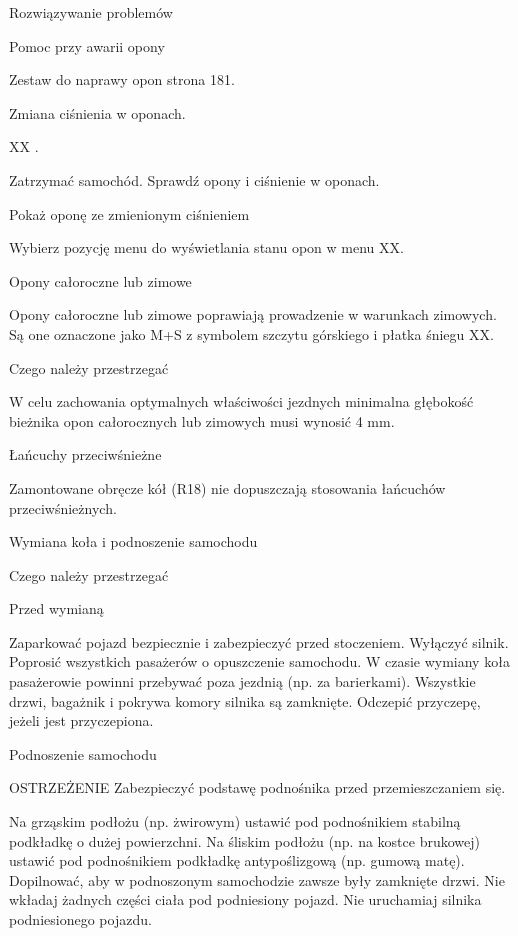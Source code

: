 Rozwiązywanie problemów

Pomoc przy awarii opony

\begin{itemizeTriangle}
	\itemTriangle Zestaw do naprawy opon \guillemotright strona 181.
\end{itemizeTriangle}

Zmiana ciśnienia w oponach.

XX .
\begin{itemizeArrow}
	\itemArrow Zatrzymać samochód.
	\itemArrow Sprawdź opony i ciśnienie w oponach.
\end{itemizeArrow}

Pokaż oponę ze zmienionym ciśnieniem

\begin{itemizeArrow}
	\itemArrow Wybierz pozycję menu do wyświetlania stanu opon w menu XX.
\end{itemizeArrow}

Opony całoroczne lub zimowe

Opony całoroczne lub zimowe poprawiają prowadzenie w warunkach zimowych. Są one oznaczone jako M+S z symbolem szczytu górskiego i płatka śniegu XX.

Czego należy przestrzegać

W celu zachowania optymalnych właściwości jezdnych minimalna głębokość bieżnika opon całorocznych lub zimowych musi wynosić 4 mm.

Łańcuchy przeciwśnieżne

Zamontowane obręcze kół (R18) nie dopuszczają stosowania łańcuchów przeciwśnieżnych.

Wymiana koła i podnoszenie samochodu

Czego należy przestrzegać

Przed wymianą

\begin{itemizeArrow}
	\itemArrow Zaparkować pojazd bezpiecznie i zabezpieczyć przed stoczeniem.
	\itemArrow Wyłączyć silnik.
	\itemArrow Poprosić wszystkich pasażerów o opuszczenie samochodu. W czasie wymiany koła pasażerowie powinni przebywać poza jezdnią (np. za barierkami).
	\itemArrow Wszystkie drzwi, bagażnik i pokrywa komory silnika są zamknięte.
	\itemArrow Odczepić przyczepę, jeżeli jest przyczepiona.
\end{itemizeArrow}

Podnoszenie samochodu

OSTRZEŻENIE
Zabezpieczyć podstawę podnośnika przed przemieszczaniem się.
\begin{itemizeTriangle}
	\itemTriangle Na grząskim podłożu (np. żwirowym) ustawić pod podnośnikiem stabilną podkładkę o dużej powierzchni.
	\itemTriangle Na śliskim podłożu (np. na kostce brukowej) ustawić pod podnośnikiem podkładkę antypoślizgową (np. gumową matę).
	\itemTriangle Dopilnować, aby w podnoszonym samochodzie zawsze były zamknięte drzwi.
	\itemTriangle Nie wkładaj żadnych części ciała pod podniesiony pojazd.
	\itemTriangle Nie uruchamiaj silnika podniesionego pojazdu.
\end{itemizeTriangle}

